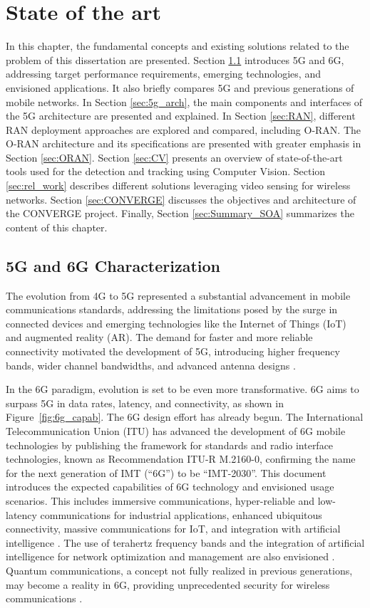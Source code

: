 \chapter{State of the art}\label{ch:state-of-the-art}

In this chapter, the fundamental concepts and existing solutions related to the problem of
this dissertation are presented.
Section \ref{sec:6g_charac} introduces 5G and 6G, addressing target performance requirements, emerging technologies, and envisioned applications.
It also briefly compares 5G and previous generations of mobile networks. In Section \ref{sec:5g_arch}, the main components and interfaces of the 5G architecture are presented and explained. In Section \ref{sec:RAN}, different RAN deployment approaches are explored and compared, including O-RAN. The O-RAN architecture and its specifications are presented with greater emphasis in Section \ref{sec:ORAN}. Section \ref{sec:CV} presents an overview of state-of-the-art tools used for the detection and tracking using Computer Vision. Section \ref{sec:rel_work} describes different solutions leveraging video sensing for wireless networks. Section \ref{sec:CONVERGE} discusses the objectives and architecture of the CONVERGE project. Finally, Section \ref{sec:Summary_SOA} summarizes the content of this chapter.

\section{5G and 6G Characterization} \label{sec:6g_charac}
The evolution from 4G to 5G represented a substantial advancement in mobile communications standards, addressing the limitations posed by the surge in connected devices and emerging technologies like the Internet of Things (IoT) and augmented reality (AR). The demand for faster and more reliable connectivity motivated the development of 5G, introducing higher frequency bands, wider channel bandwidths, and advanced antenna designs \cite{5G_apps}.

In the 6G paradigm, evolution is set to be even more transformative. 6G aims to surpass 5G in data rates, latency, and connectivity, as shown in Figure~\ref{fig:6g_capab}. The 6G design effort has already begun. The International Telecommunication Union (ITU) has advanced the development of 6G mobile technologies by publishing the framework for standards and radio interface technologies, known as Recommendation ITU-R M.2160-0,  \cite{ITU_2160-0} confirming the name for the next generation of IMT (“6G”) to be “IMT-2030”. This document introduces the expected capabilities of 6G technology and envisioned usage scenarios. This includes immersive communications, hyper-reliable and low-latency communications for industrial applications, enhanced ubiquitous connectivity, massive communications for IoT, and integration with artificial intelligence \cite{6G_ITU}. The use of terahertz frequency bands and the integration of artificial intelligence for network optimization and management are also envisioned \cite{6G_ITU}. Quantum communications, a concept not fully realized in previous generations, may become a reality in 6G, providing unprecedented security for wireless communications \cite{6G_ITU}.

